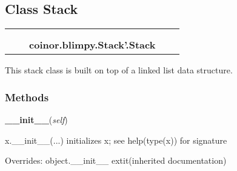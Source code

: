 
\subsection{Class Stack}

    \label{coinor:blimpy:Stack':Stack}
\begin{tabular}{cccccc}
\multicolumn{2}{r}{\settowidth{\BCL}{object}\multirow{2}{\BCL}{object}}
&&
  \\\cline{3-3}
  &&\multicolumn{1}{c|}{}
&&
  \\
&&\multicolumn{2}{l}{\textbf{coinor.blimpy.Stack'.Stack}}
\end{tabular}

This stack class is built on top of a linked list data structure.



  \subsubsection{Methods}

    \vspace{0.5ex}

\hspace{.8\funcindent}\begin{boxedminipage}{\funcwidth}

    \raggedright \textbf{\_\_init\_\_}(\textit{self})

\setlength{\parskip}{2ex}
    x.\_\_init\_\_(...) initializes x; see help(type(x)) for signature

\setlength{\parskip}{1ex}
      Overrides: object.\_\_init\_\_ 	extit{(inherited documentation)}

    \end{boxedminipage}

    \vspace{0.5ex}

